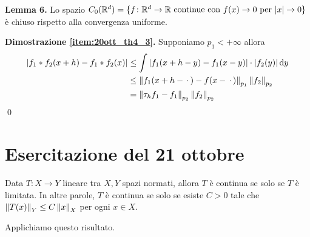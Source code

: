 \documentclass[a4paper, 12pt]{report}
\begin{document}
\textbf{Lemma 6.}
Lo spazio $C_0(\mathbb R^d) = \{ f \colon \mathbb R^d \to \mathbb R \text{ continue con } f(x) \to 0 \text{ per } |x| \to 0 \}$ è chiuso rispetto alla convergenza uniforme.

\textbf{Dimostrazione \ref{item:20ott_th4_3}.} 
Supponiamo $p_1 < +\infty$ allora
$$
\begin{aligned}
	|f_1 \ast f_2(x + h) - f_1 \ast f_2(x)|
	&\leq \int |f_1(x + h - y) - f_1(x - y)| \cdot |f_2(y)| \,\mathrm{d} y \\
	&\leq \left\lVert f_1(x + h - \,\cdot\,) - f(x - \,\cdot\,) \right\rVert_{p_1} \left\lVert f_2 \right\rVert_{p_2} \\
	&= \left\lVert \tau_h f_1 - f_1 \right\rVert_{p_2} \left\lVert f_2 \right\rVert_{p_2}
\end{aligned}
$$
\qed


\section{Esercitazione del 21 ottobre}


Data $T \colon X \to Y$ lineare tra $X,Y$ spazi normati, allora $T$ è continua se solo se $T$ è limitata.
In altre parole, $T$ è continua se solo se esiste  $C > 0$ tale che $\left\lVert T(x) \right\rVert_Y \leq C \left\lVert x \right\rVert_X$ per ogni $x \in X$.

Applichiamo questo risultato.
\end{document}

